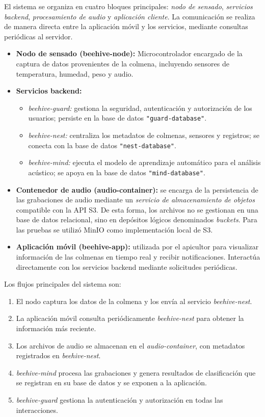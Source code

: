 \label{sec:arquitectura_sistema}

El sistema se organiza en cuatro bloques principales: \emph{nodo de sensado}, \emph{servicios backend}, \emph{procesamiento de audio} y \emph{aplicación cliente}. La comunicación se realiza de manera directa entre la aplicación móvil y los servicios, mediante consultas periódicas al servidor.

\begin{itemize}
    \item \textbf{Nodo de sensado (beehive-node):} Microcontrolador encargado de la captura de datos provenientes de la colmena, incluyendo sensores de temperatura, humedad, peso y audio.
    \item \textbf{Servicios backend:}
    \begin{itemize}
        \item \textit{beehive-guard:} gestiona la seguridad, autenticación y autorización de los usuarios; persiste en la base de datos \texttt{"guard-database"}.
        \item \textit{beehive-nest:} centraliza los metadatos de colmenas, sensores y registros; se conecta con la base de datos \texttt{"nest-database"}.
        \item \textit{beehive-mind:} ejecuta el modelo de aprendizaje automático para el análisis acústico; se apoya en la base de datos \texttt{"mind-database"}.
    \end{itemize}
    \item \textbf{Contenedor de audio (audio-container):} 
    se encarga de la persistencia de las grabaciones de audio mediante un 
    \emph{servicio de almacenamiento de objetos} compatible con la API S3. 
    De esta forma, los archivos no se gestionan en una base de datos relacional, 
    sino en depósitos lógicos denominados \emph{buckets}. 
    Para las pruebas se utilizó MinIO como implementación local de S3.
    \item \textbf{Aplicación móvil (beehive-app):} utilizada por el apicultor para visualizar información de las colmenas en tiempo real y recibir notificaciones. Interactúa directamente con los servicios backend mediante solicitudes periódicas.
\end{itemize}

Los flujos principales del sistema son:
\begin{enumerate}
    \item El nodo captura los datos de la colmena y los envía al servicio \textit{beehive-nest}.
    \item La aplicación móvil consulta periódicamente \textit{beehive-nest} para obtener la información más reciente.
    \item Los archivos de audio se almacenan en el \textit{audio-container}, con metadatos registrados en \textit{beehive-nest}.
    \item \textit{beehive-mind} procesa las grabaciones y genera resultados de clasificación que se registran en su base de datos y se exponen a la aplicación.
    \item \textit{beehive-guard} gestiona la autenticación y autorización en todas las interacciones.
\end{enumerate}


